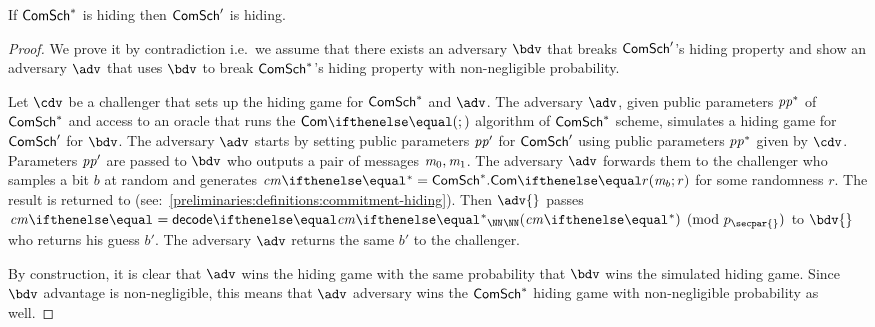 \begin{theorem}[Hiding]\label{instantiation:th:com-bin-field-hiding}
    If $\mathsf{ComSch}^*$ is hiding then $\mathsf{ComSch}'$ is hiding.
\end{theorem}
\begin{proof}
	We prove it by contradiction i.e.~we assume that there exists an adversary $\bdv$ that breaks $\mathsf{ComSch}'$'s hiding property and show an adversary $\adv$ that uses $\bdv$ to break $\mathsf{ComSch}^*$'s hiding property with non-negligible probability.

  Let $\cdv$ be a challenger that sets up the hiding game for $\mathsf{ComSch}^*$ and $\adv$.
	The adversary $\adv$, given public parameters $\mathit{pp}^*$ of $\mathsf{ComSch}^*$ and access to an oracle that runs the $\commit{}{}$ algorithm of $\mathsf{ComSch}^*$ scheme, simulates a hiding game for $\mathsf{ComSch}'$ for $\bdv$.
  The adversary $\adv$ starts by setting public parameters $\mathit{pp}'$ for $\mathsf{ComSch}'$ using public parameters $\mathit{pp}^*$ given by $\cdv$. Parameters $\mathit{pp}'$ are passed to $\bdv$ who outputs a pair of messages $\mathit{m}_0, \mathit{m}_1$.
  The adversary $\adv$ forwards them to the challenger who samples a bit $b$ at random and generates $\cm{}^*= \comm^*.\commit{\msg_b}{r}$ for some randomness $r$. The result is returned to \adv{} (see:~\cref{preliminaries:definitions:commitment-hiding}).
	Then $\adv{}$ passes $\cm{}= \decode{\cm{}^*}{\NN} \pmod{p_\secpar{}}$ to $\bdv{}$ who returns his guess $b'$. The adversary $\adv$ returns the same $b'$ to the challenger.

	By construction, it is clear that $\adv$ wins the hiding game with the same probability that $\bdv$ wins the simulated hiding game. Since $\bdv$ advantage is non-negligible, this means that $\adv$ adversary wins the $\mathsf{ComSch}^*$ hiding game with non-negligible probability as well.
\end{proof}

